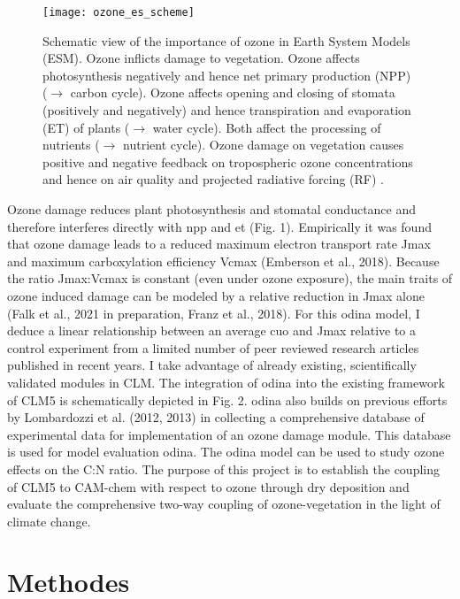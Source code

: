\documentclass[11pt, a4paper, oneside, article]{memoir}
\newcommand{\pcite}[1]{\parencite{#1}}
\begin{document}
\begin{wrapfigure}[19]{R}[0pt]{0.5\textwidth}
  \centering
  \texttt{[image: ozone\_es\_scheme]}
  \caption{Schematic view of the importance of ozone in Earth System Models (ESM). Ozone inflicts damage to vegetation. Ozone affects photosynthesis negatively and hence net primary production (NPP) ($\rightarrow$ carbon cycle). Ozone affects opening and closing of stomata (positively and negatively) and hence transpiration and evaporation (ET) of plants ($\rightarrow$ water cycle). Both affect the processing of nutrients ($\rightarrow$ nutrient cycle). Ozone damage on vegetation causes positive and negative feedback on tropospheric ozone concentrations and hence on air quality and projected radiative forcing (RF) \pcite{Nat:Sitch2007}.}
  \label{fig:ozone_es_scheme}
\end{wrapfigure}

Ozone damage reduces plant photosynthesis and stomatal conductance and therefore interferes directly with \gls{npp} and \gls{et} (Fig. 1). Empirically it was found that ozone damage leads to a reduced maximum electron transport rate Jmax and maximum carboxylation efficiency Vcmax (Emberson et al., 2018). Because the ratio Jmax:Vcmax is constant (even under ozone exposure), the main traits of ozone induced damage can be modeled by a relative reduction in Jmax alone (Falk et al., 2021 in preparation, Franz et al., 2018). For this \gls{odina} model, I deduce a linear relationship between an average \gls{cuo} and Jmax relative to a control experiment from a limited number of peer reviewed research articles published in recent years. I take advantage of already existing, scientifically validated modules in CLM. The integration of \gls{odina} into the existing framework of CLM5 is schematically depicted in Fig. 2. \gls{odina} also builds on previous efforts by Lombardozzi et al. (2012, 2013) in collecting a comprehensive database of experimental data for implementation of an ozone damage module. This database is used for model evaluation \gls{odina}. The \gls{odina} model can be used to study ozone effects on the C:N ratio. The purpose of this project is to establish the coupling of CLM5 to CAM-chem with respect to ozone through dry deposition and evaluate the comprehensive two-way coupling of ozone-vegetation in the light of climate change.


\chapter{Methodes}
\end{document}
